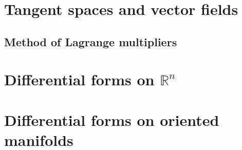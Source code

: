 \documentclass[letter-paper]{tufte-book}
\begin{document}

\chapter{Tangent spaces and vector fields}


\section{Method of Lagrange multipliers}


\chapter{Differential forms on $\mathbb{R}^n$}


\chapter{Differential forms on oriented manifolds}








\mainmatter




%


\end{document}
